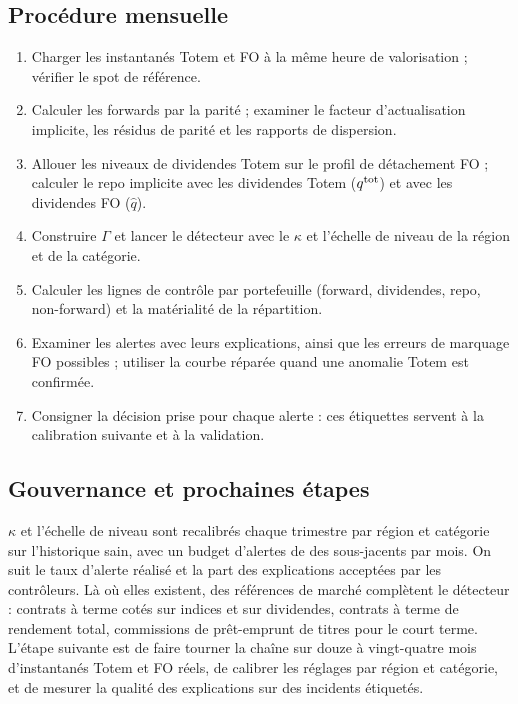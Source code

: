 \subsection{Procédure mensuelle}
\begin{enumerate}
\item Charger les instantanés Totem et FO à la même heure de valorisation ; vérifier le spot de référence.
\item Calculer les forwards par la parité ; examiner le facteur d'actualisation implicite, les résidus de parité et
les rapports de dispersion.
\item Allouer les niveaux de dividendes Totem sur le profil de détachement FO ; calculer le repo implicite avec les
dividendes Totem ($q^{\mathrm{tot}}$) et avec les dividendes FO ($\hat q$).
\item Construire $\Gamma$ et lancer le détecteur avec le $\kappa$ et l'échelle de niveau de la région et de la catégorie.
\item Calculer les lignes de contrôle par portefeuille (forward, dividendes, repo, non-forward) et la matérialité de la
répartition.
\item Examiner les alertes avec leurs explications, ainsi que les erreurs de marquage FO possibles ; utiliser la courbe
réparée quand une anomalie Totem est confirmée.
\item Consigner la décision prise pour chaque alerte : ces étiquettes servent à la calibration suivante et à la
validation.
\end{enumerate}

\subsection{Gouvernance et prochaines étapes}
$\kappa$ et l'échelle de niveau sont recalibrés chaque trimestre par région et catégorie sur l'historique sain, avec un
budget d'alertes de \vFPR{} des sous-jacents par mois. On suit le taux d'alerte réalisé et la part des explications
acceptées par les contrôleurs. Là où elles existent, des références de marché complètent le détecteur : contrats à
terme cotés sur indices et sur dividendes, contrats à terme de rendement total, commissions de prêt-emprunt de titres
pour le court terme. L'étape suivante est de faire tourner la chaîne sur douze à vingt-quatre mois d'instantanés Totem
et FO réels, de calibrer les réglages par région et catégorie, et de mesurer la qualité des explications sur des
incidents étiquetés.

